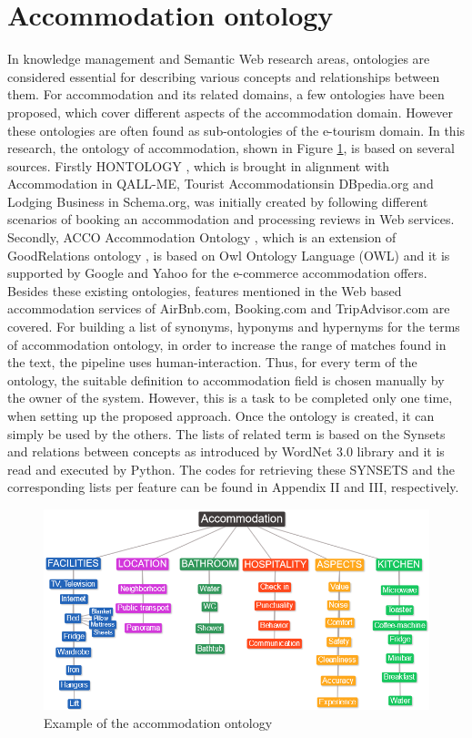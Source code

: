 \section{Accommodation ontology} 
In knowledge management and Semantic Web research areas, ontologies are considered essential for describing various concepts and relationships between them. For accommodation and its related domains, a few ontologies have been proposed, which cover different aspects of the accommodation domain. However these ontologies are often found as sub-ontologies of the e-tourism domain. In this research, the ontology of accommodation, shown in Figure \ref{fig:onto}, is based on several sources. Firstly HONTOLOGY \cite{chaves2012hontology}, which is brought in alignment with Accommodation in QALL-ME, Tourist Accommodationsin DBpedia.org and Lodging Business  in Schema.org, was initially created by following different scenarios of booking an accommodation and processing reviews in Web services. Secondly, ACCO Accommodation Ontology \cite{hepp2013accommodation}, which is an extension of GoodRelations ontology \cite{hepp2008goodrelations}, is based on Owl Ontology Language (OWL) and it is supported by Google and Yahoo for the e-commerce accommodation offers.
Besides these existing ontologies, features mentioned in the Web based accommodation services of AirBnb.com, Booking.com and TripAdvisor.com are covered. For building a list of synonyms, hyponyms and hypernyms for the terms of accommodation ontology, in order to increase the range of matches found in the text, the pipeline uses human-interaction. Thus, for every term of the ontology, the suitable definition to accommodation field is chosen manually by the owner of the system. However, this is a task to be completed only one time, when setting up the proposed approach. Once the ontology is created, it can simply be used by the others. The lists of related term is based on the Synsets and relations between concepts as introduced by WordNet 3.0 library and it is read and executed by Python. The codes for retrieving these SYNSETS and the corresponding lists per feature can be found in Appendix II and III, respectively.
\vspace{1.3cm}
\begin{figure}[h!]
	\centering
	\includegraphics[height=0.35\textheight]{Ontology_of_accommodation}
	\caption{Example of the accommodation ontology}
	\label{fig:onto}
\end{figure}